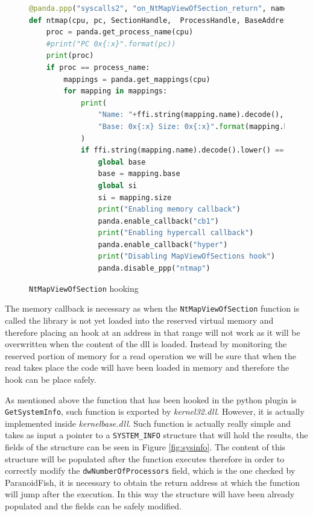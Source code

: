 \begin{figure}[htp]
\centering
\begin{lstlisting}[language=Python] 
@panda.ppp("syscalls2", "on_NtMapViewOfSection_return", name="ntmap")
def ntmap(cpu, pc, SectionHandle,  ProcessHandle, BaseAddress, ZeroBits, CommitSize, SectionOffset, ViewSize, InheritDisposition, AllocationType, Win32Protect):
    proc = panda.get_process_name(cpu)
    #print("PC 0x{:x}".format(pc))
    print(proc)
    if proc == process_name:
        mappings = panda.get_mappings(cpu)
        for mapping in mappings:
            print(
                "Name: "+ffi.string(mapping.name).decode(),
                "Base: 0x{:x} Size: 0x{:x}".format(mapping.base,mapping.size)
            )
            if ffi.string(mapping.name).decode().lower() == "kernel32.dll":
                global base
                base = mapping.base
                global si
                si = mapping.size
                print("Enabling memory callback")
                panda.enable_callback("cb1")
                print("Enabling hypercall callback")
                panda.enable_callback("hyper")
                print("Disabling MapViewOfSections hook")
                panda.disable_ppp("ntmap")
\end{lstlisting}
\caption{\lstinline{NtMapViewOfSection} hooking}
\label{fig:ntmap}
\end{figure}

The memory callback is necessary as when the \lstinline{NtMapViewOfSection} function is called the library is not yet loaded into the reserved virtual memory and therefore placing an hook at an address in that range will not work as it will be overwritten when the content of the dll is loaded. Instead by monitoring the reserved portion of memory for a read operation we will be sure that when the read takes place the code will have been loaded in memory and therefore the hook can be place safely. 

As mentioned above the function that has been hooked in the python plugin is \lstinline{GetSystemInfo}, such function is exported by \textit{kernel32.dll}. However, it is actually implemented inside \textit{kernelbase.dll}. Such function is actually really simple and takes as input a pointer to a \lstinline{SYSTEM_INFO} structure that will hold the results, the fields of the structure can be seen in Figure \ref{fig:sysinfo}. The content of this structure will be populated after the function executes therefore in order to correctly modify the \lstinline{dwNumberOfProcessors} field, which is the one checked by ParanoidFish, it is necessary to obtain the return address at which the function will jump after the execution. In this way the structure will have been already populated and the fields can be safely modified.


